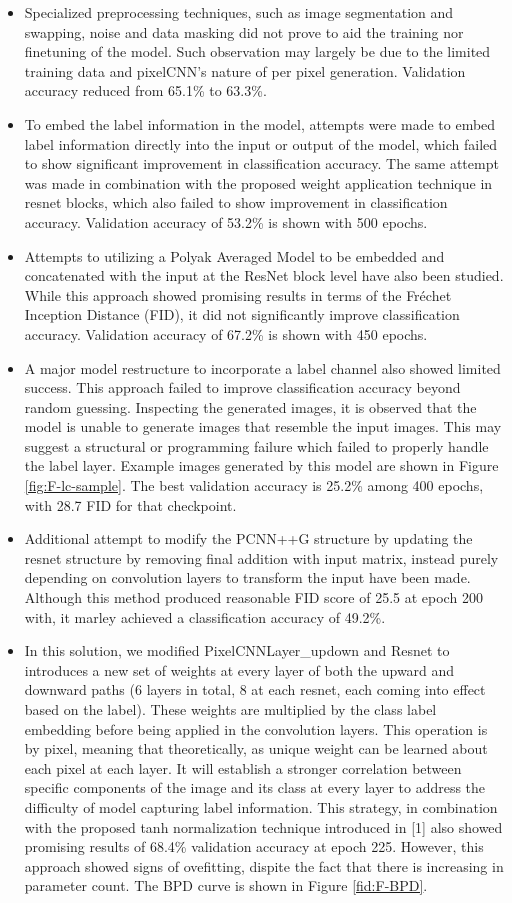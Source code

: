 \documentclass{article}
\begin{document}
\begin{itemize}
    \item Specialized preprocessing techniques, such as image segmentation and swapping, noise and data masking did not prove to aid the training nor finetuning of the model. Such observation may largely be due to the limited training data and pixelCNN's nature of per pixel generation. Validation accuracy reduced from 65.1\% to 63.3\%. 
    \item To embed the label information in the model, attempts were made to embed label information directly into the input or output of the model, which failed to show significant improvement in classification accuracy. The same attempt was made in combination with the proposed weight application technique in resnet blocks, which also failed to show improvement in classification accuracy. Validation accuracy of 53.2\% is shown with 500 epochs.
    \item Attempts to utilizing a Polyak Averaged Model to be embedded and concatenated with the input at the ResNet block level have also been studied. While this approach showed promising results in terms of the Fréchet Inception Distance (FID), it did not significantly improve classification accuracy. Validation accuracy of 67.2\% is shown with 450 epochs.
    \item A major model restructure to incorporate a label channel also showed limited success. This approach failed to improve classification accuracy beyond random guessing. Inspecting the generated images, it is observed that the model is unable to generate images that resemble the input images. This may suggest a structural or programming failure which failed to properly handle the label layer. Example images generated by this model are shown in Figure \ref{fig:F-lc-sample}. The best validation accuracy is 25.2\% among 400 epochs, with 28.7 FID for that checkpoint.
    \item Additional attempt to modify the PCNN++G structure by updating the resnet structure by removing final addition with input matrix, instead purely depending on convolution layers to transform the input have been made. Although this method produced reasonable FID score of 25.5 at epoch 200 with, it marley achieved a classification accuracy of 49.2\%. 
    \item In this solution, we modified PixelCNNLayer\_up\/down and Resnet to introduces a new set of weights at every layer of both the upward and downward paths (6 layers in total, 8 at each resnet, each coming into effect based on the label). These weights are multiplied by the class label embedding before being applied in the convolution layers. This operation is by pixel, meaning that theoretically, as unique weight can be learned about each pixel at each layer. It will establish a stronger correlation between specific components of the image and its class at every layer to address the difficulty of model capturing label information. This strategy, in combination with the proposed tanh normalization technique introduced in [1] also showed promising results of 68.4\% validation accuracy at epoch 225. However, this approach showed signs of ovefitting, dispite the fact that there is increasing in parameter count. The BPD curve is shown in Figure \ref{fid:F-BPD}. 

\end{itemize}
\end{document}
